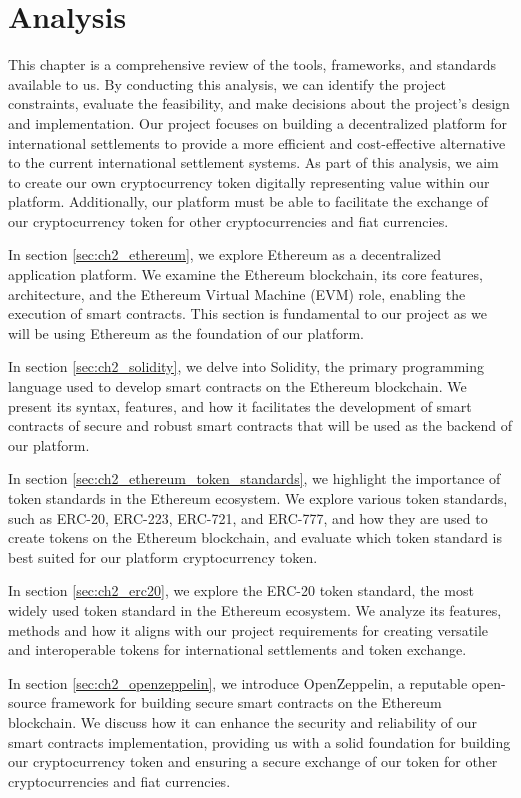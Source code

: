 \chapter{Analysis}
\label{ch:analysis}

This chapter is a comprehensive review of the tools, frameworks, and standards available to us. By conducting this analysis, we can identify the project constraints, evaluate the feasibility,
and make decisions about the project's design and implementation. Our project focuses on building a decentralized platform for international
settlements to provide a more efficient and cost-effective alternative to the current international settlement systems. As part of this analysis,
we aim to create our own cryptocurrency token digitally representing value within our platform. Additionally, our platform must be
able to facilitate the exchange of our cryptocurrency token for other cryptocurrencies and fiat currencies.

In section \ref{sec:ch2_ethereum}, we explore Ethereum as a decentralized application platform. We examine the Ethereum blockchain, its core features,
architecture, and the Ethereum Virtual Machine (EVM) role, enabling the execution of smart contracts. This section is fundamental to our project
as we will be using Ethereum as the foundation of our platform.

In section \ref{sec:ch2_solidity}, we delve into Solidity, the primary programming language used to develop smart contracts on the Ethereum blockchain.
We present its syntax, features, and how it facilitates the development of smart contracts of secure and robust smart contracts that will be used as the backend
of our platform.

In section \ref{sec:ch2_ethereum_token_standards}, we highlight the importance of token standards in the Ethereum ecosystem. We explore various token standards,
such as ERC-20, ERC-223, ERC-721, and ERC-777, and how they are used to create tokens on the Ethereum blockchain, and evaluate which token standard is best
suited for our platform cryptocurrency token.

In section \ref{sec:ch2_erc20}, we explore the ERC-20 token standard, the most widely used token standard in the Ethereum ecosystem. We analyze its features,
methods and how it aligns with our project requirements for creating versatile and interoperable tokens for international settlements and token exchange.

In section \ref{sec:ch2_openzeppelin}, we introduce OpenZeppelin, a reputable open-source framework for building secure smart contracts on the Ethereum blockchain.
We discuss how it can enhance the security and reliability of our smart contracts implementation, providing us with a solid foundation for building our
cryptocurrency token and ensuring a secure exchange of our token for other cryptocurrencies and fiat currencies.

